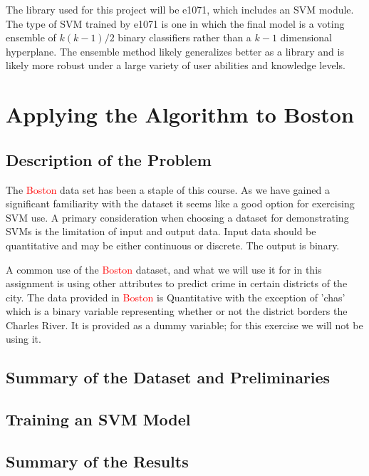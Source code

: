 \documentclass[a4paper,man,natbib]{apa6}
\begin{document}
The library used for this project will be e1071, which includes an SVM module. The type of SVM trained by e1071 is one in which the final model is a voting ensemble of $k(k-1)/2$ binary classifiers rather than a $k-1$ dimensional hyperplane. The ensemble method likely generalizes better as a library and is likely more robust under a large variety of user abilities and knowledge levels.

\clearpage

\section{Applying the Algorithm to Boston}
\subsection{Description of the Problem}

The \textcolor{red}{Boston} data set has been a staple of this course. As we have gained a significant familiarity with the dataset it seems like a good option for exercising SVM use. A primary consideration when choosing a dataset for demonstrating SVMs is the limitation of input and output data. Input data should be quantitative and may be either continuous or discrete. The output is binary. 

A common use of the \textcolor{red}{Boston} dataset, and what we will use it for in this assignment is using other attributes to predict crime in certain districts of the city. The data provided in \textcolor{red}{Boston} is Quantitative with the exception of 'chas' which is a binary variable representing whether or not the district borders the Charles River. It is provided as a dummy variable; for this exercise we will not be using it.

\subsection{Summary of the Dataset and Preliminaries}



\subsection{Training an SVM Model}



\subsection{Summary of the Results}
\end{document}
